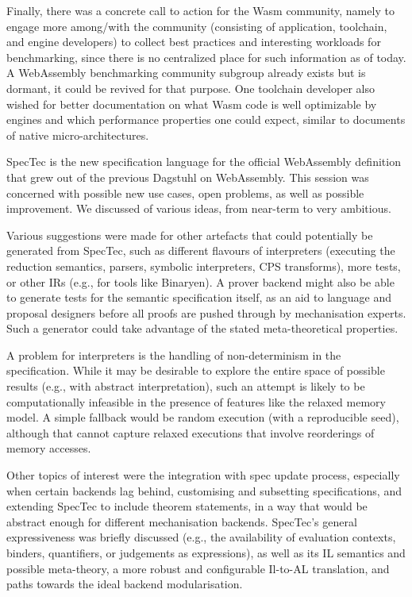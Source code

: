 \documentclass[a4paper,UKenglish]{dagrep-v2018}
\begin{document}
Finally, there was a concrete call to action for the Wasm community, namely to engage more among/with the community (consisting of application, toolchain, and engine developers) to collect best practices and interesting workloads for benchmarking, since there is no centralized place for such information as of today. A WebAssembly benchmarking community subgroup already exists but is dormant, it could be revived for that purpose. One toolchain developer also wished for better documentation on what Wasm code is well optimizable by engines and which performance properties one could expect, similar to documents of native micro-architectures.

\license
{}

SpecTec is the new specification language for the official WebAssembly definition that grew out of the previous Dagstuhl on WebAssembly. This session was concerned with possible new use cases, open problems, as well as possible improvement. We discussed of various ideas, from near-term to very ambitious.

Various suggestions were made for other artefacts that could potentially be generated from SpecTec, such as
different flavours of interpreters (executing the reduction semantics, parsers, symbolic interpreters, CPS transforms), more tests, or other IRs (e.g., for tools like Binaryen). A prover backend might also be able to generate tests for the semantic specification itself, as an aid to language and proposal designers before all proofs are pushed through by mechanisation experts. Such a generator could take advantage of the stated meta-theoretical properties. 

A problem for interpreters is the handling of non-determinism in the specification. While it may be desirable to explore the entire space of possible results (e.g., with abstract interpretation), such an attempt is likely to be computationally infeasible in the presence of features like the relaxed memory model. A simple fallback would be random execution (with a reproducible seed), although that cannot capture relaxed executions that involve reorderings of memory accesses.

Other topics of interest were the integration with spec update process, especially when certain backends lag behind, customising and subsetting specifications, and extending SpecTec to include theorem statements, in a way that would be abstract enough for different mechanisation backends. SpecTec’s general expressiveness was briefly discussed (e.g., the availability of evaluation contexts, binders, quantifiers, or judgements as expressions), as well as its IL semantics and possible meta-theory, a more robust and configurable Il-to-AL translation, and paths towards the ideal backend modularisation.
\end{document}

